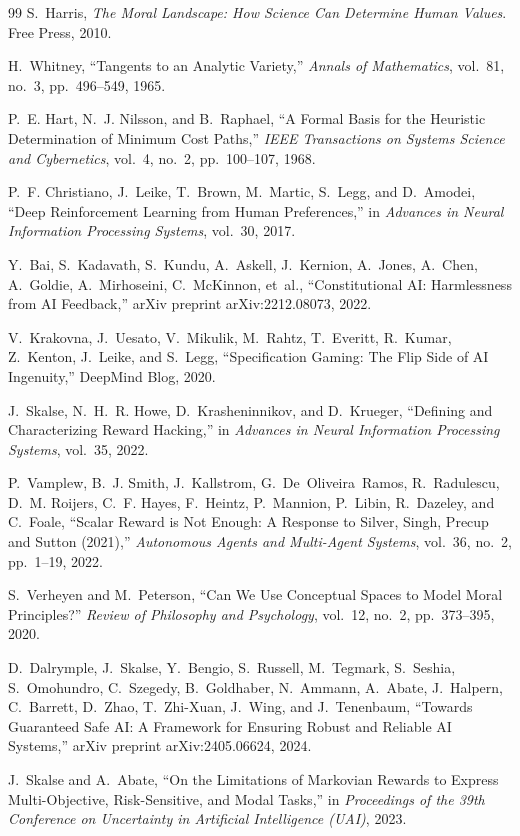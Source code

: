 \documentclass[12pt,letterpaper]{article}
\theoremstyle{definition}
\theoremstyle{remark}
\begin{document}
\begin{thebibliography}{99}
S.~Harris, \emph{The Moral Landscape: How Science Can Determine Human Values}. Free Press, 2010.

H.~Whitney, ``Tangents to an Analytic Variety,'' \emph{Annals of Mathematics}, vol.~81, no.~3, pp.~496--549, 1965.

P.~E. Hart, N.~J. Nilsson, and B.~Raphael, ``A Formal Basis for the Heuristic Determination of Minimum Cost Paths,'' \emph{IEEE Transactions on Systems Science and Cybernetics}, vol.~4, no.~2, pp.~100--107, 1968.

P.~F. Christiano, J.~Leike, T.~Brown, M.~Martic, S.~Legg, and D.~Amodei, ``Deep Reinforcement Learning from Human Preferences,'' in \emph{Advances in Neural Information Processing Systems}, vol.~30, 2017.

Y.~Bai, S.~Kadavath, S.~Kundu, A.~Askell, J.~Kernion, A.~Jones, A.~Chen, A.~Goldie, A.~Mirhoseini, C.~McKinnon, et~al., ``Constitutional AI: Harmlessness from AI Feedback,'' arXiv preprint arXiv:2212.08073, 2022.

V.~Krakovna, J.~Uesato, V.~Mikulik, M.~Rahtz, T.~Everitt, R.~Kumar, Z.~Kenton, J.~Leike, and S.~Legg, ``Specification Gaming: The Flip Side of AI Ingenuity,'' DeepMind Blog, 2020.

J.~Skalse, N.~H.~R. Howe, D.~Krasheninnikov, and D.~Krueger, ``Defining and Characterizing Reward Hacking,'' in \emph{Advances in Neural Information Processing Systems}, vol.~35, 2022.

P.~Vamplew, B.~J. Smith, J.~Kallstrom, G.~De~Oliveira~Ramos, R.~Radulescu, D.~M. Roijers, C.~F. Hayes, F.~Heintz, P.~Mannion, P.~Libin, R.~Dazeley, and C.~Foale, ``Scalar Reward is Not Enough: A Response to Silver, Singh, Precup and Sutton (2021),'' \emph{Autonomous Agents and Multi-Agent Systems}, vol.~36, no.~2, pp.~1--19, 2022.

S.~Verheyen and M.~Peterson, ``Can We Use Conceptual Spaces to Model Moral Principles?'' \emph{Review of Philosophy and Psychology}, vol.~12, no.~2, pp.~373--395, 2020.

D.~Dalrymple, J.~Skalse, Y.~Bengio, S.~Russell, M.~Tegmark, S.~Seshia, S.~Omohundro, C.~Szegedy, B.~Goldhaber, N.~Ammann, A.~Abate, J.~Halpern, C.~Barrett, D.~Zhao, T.~Zhi-Xuan, J.~Wing, and J.~Tenenbaum, ``Towards Guaranteed Safe AI: A Framework for Ensuring Robust and Reliable AI Systems,'' arXiv preprint arXiv:2405.06624, 2024.

J.~Skalse and A.~Abate, ``On the Limitations of Markovian Rewards to Express Multi-Objective, Risk-Sensitive, and Modal Tasks,'' in \emph{Proceedings of the 39th Conference on Uncertainty in Artificial Intelligence (UAI)}, 2023.

\end{thebibliography}
\end{document}
